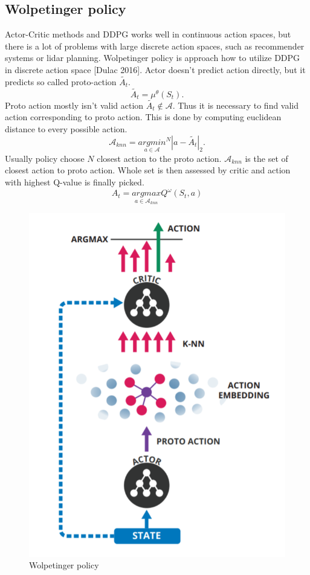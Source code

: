 \subsection{Wolpetinger policy}
Actor-Critic methods and DDPG works well in continuous action spaces, but there is a lot of problems with large discrete action spaces, such as recommender systems or lidar planning. Wolpetinger policy is approach how to utilize DDPG in discrete action space [Dulac 2016]. Actor doesn't predict action directly, but it predicts so called proto-action $\tilde{A_t}$.
\begin{equation}
\tilde{A_t} = \mu^\theta(S_t).
\end{equation}
Proto action mostly isn't valid action $\tilde{A_t} \notin \mathcal{A}$. Thus it is necessary to find valid action corresponding to proto action. This is done by computing euclidean distance to every possible action.
\begin{equation}
\mathcal{A}_{knn} = \underset{a \in \mathcal{A}}{argmin}^N | a - \tilde{A_t} |_2 .
\end{equation}
Usually policy choose $N$ closest action to the proto action. $\mathcal{A}_{knn}$ is the set of closest action to proto action. Whole set is then assessed by critic and action with highest Q-value is finally picked.
\begin{equation}
A_t = \underset{a \in \mathcal{A}_{knn}}{argmax} Q^\omega(S_t, a)
\end{equation}
\begin{figure}[!h]
\centering
\includegraphics[scale=0.4]{fig/wolpetinger-policy.png}
\caption{Wolpetinger policy}
\end{figure}